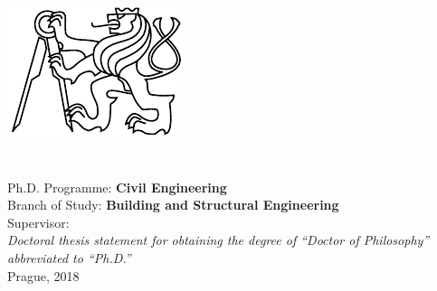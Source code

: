 %
%
\begin{titlepage}
\begin{center}
{\Large\textsc{\univname}}\\[0.3cm]
{\large \facname}\\
\deptname\\[0.5cm]
\includegraphics[width=.2\textwidth]{figures/logo-cvut}\\[1cm]
{\Large\textsc{\authorname}}\\[1cm]
{\LARGE \bfseries \ttitle}\\[2cm]

\large
Ph.D. Programme: \textbf{Civil Engineering} \\
Branch of Study: \textbf{Building and Structural Engineering} \\[1cm]
Supervisor: \textbf{\supname} \\[3cm]

\large \textit{Doctoral thesis statement for obtaining the degree of ``Doctor of Philosophy'' abbreviated to ``Ph.D.''}\\[2cm]
{\large Prague, 2018}\\[4cm]
\vfill
\end{center}
\end{titlepage}



\begin{abstract}
\addchaptertocentry{\abstractname} %



\noindent
\textbf{\keywordstitle} \keywordnames
\end{abstract}


